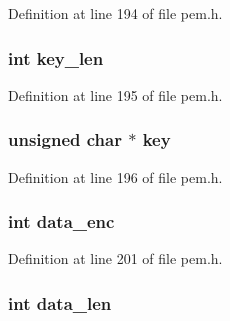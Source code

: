 Definition at line 194 of file pem.\+h.

\subsubsection[{\texorpdfstring{key\+\_\+len}{key_len}}]{\setlength{\rightskip}{0pt plus 5cm}int key\+\_\+len}\hypertarget{structpem__ctx__st_a7d361be539db0a416204f2af38248d08}{}\label{structpem__ctx__st_a7d361be539db0a416204f2af38248d08}


Definition at line 195 of file pem.\+h.

\subsubsection[{\texorpdfstring{key}{key}}]{\setlength{\rightskip}{0pt plus 5cm}unsigned char $\ast$ key}\hypertarget{structpem__ctx__st_a7da5dfcff1c288368511fd309ad221f8}{}\label{structpem__ctx__st_a7da5dfcff1c288368511fd309ad221f8}


Definition at line 196 of file pem.\+h.

\subsubsection[{\texorpdfstring{data\+\_\+enc}{data_enc}}]{\setlength{\rightskip}{0pt plus 5cm}int data\+\_\+enc}\hypertarget{structpem__ctx__st_a615bf4d401e219372a83a49be39df8d7}{}\label{structpem__ctx__st_a615bf4d401e219372a83a49be39df8d7}


Definition at line 201 of file pem.\+h.

\subsubsection[{\texorpdfstring{data\+\_\+len}{data_len}}]{\setlength{\rightskip}{0pt plus 5cm}int data\+\_\+len}\hypertarget{structpem__ctx__st_aa0b40a33cab1c8fa68e1fa86c686d6d8}{}\label{structpem__ctx__st_aa0b40a33cab1c8fa68e1fa86c686d6d8}


